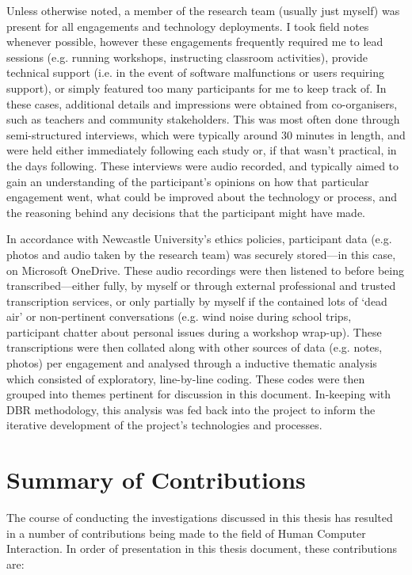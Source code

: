 Unless otherwise noted, a member of the research team (usually just myself) was present for all engagements and technology deployments. I took field notes whenever possible, however these engagements frequently required me to lead sessions (e.g. running workshops, instructing classroom activities), provide technical support (i.e. in the event of software malfunctions or users requiring support), or simply featured too many participants for me to keep track of. In these cases, additional details and impressions were obtained from co-organisers, such as teachers and community stakeholders. This was most often done through semi-structured interviews, which were typically around 30 minutes in length, and were held either immediately following each study or, if that wasn't practical, in the days following. These interviews were audio recorded, and typically aimed to gain an understanding of the participant's opinions on how that particular engagement went, what could be improved about the technology or process, and the reasoning behind any decisions that the participant might have made.

In accordance with Newcastle University's ethics policies, participant data (e.g. photos and audio taken by the research team) was securely stored---in this case, on Microsoft OneDrive. These audio recordings were then listened to before being transcribed---either fully, by myself or through external professional and trusted transcription services, or only partially by myself if the contained lots of `dead air' or non-pertinent conversations (e.g. wind noise during school trips, participant chatter about personal issues during a workshop wrap-up). These transcriptions were then collated along with other sources of data (e.g. notes, photos) per engagement and analysed through a inductive thematic analysis which consisted of exploratory, line-by-line coding. These codes were then grouped into themes pertinent for discussion in this document. In-keeping with DBR methodology, this analysis was fed back into the project to inform the iterative development of the project's technologies and processes.

\section{Summary of Contributions}
The course of conducting the investigations discussed in this thesis has resulted in a number of contributions being made to the field of Human Computer Interaction. In order of presentation in this thesis document, these contributions are:

